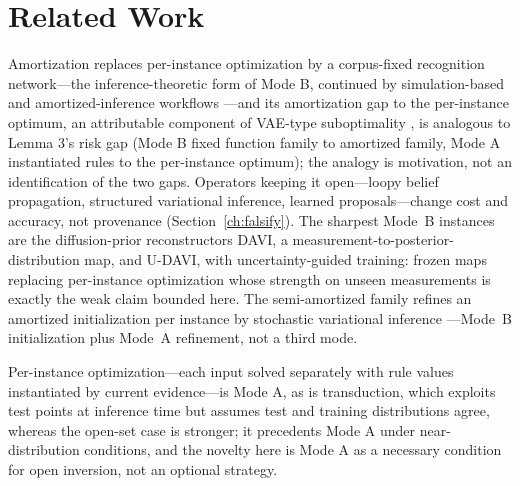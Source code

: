 \section{Related Work}
\label{ch:related}

Amortization replaces per-instance optimization by a corpus-fixed recognition network---the inference-theoretic form of Mode B, continued by simulation-based and amortized-inference workflows \citep{cranmer2020,radev2023}---and its amortization gap to the per-instance optimum, an attributable component of VAE-type suboptimality \citep{cremer2018}, is analogous to Lemma 3's risk gap (Mode B fixed function family to amortized family, Mode A instantiated rules to the per-instance optimum); the analogy is motivation, not an identification of the two gaps. Operators keeping it open---loopy belief propagation, structured variational inference, learned proposals---change cost and accuracy, not provenance (Section~\ref{ch:falsify}). The sharpest Mode~B instances are the diffusion-prior reconstructors DAVI, a measurement-to-posterior-distribution map, and U-DAVI, with uncertainty-guided training: frozen maps replacing per-instance optimization \citep{lee2024davi,varshney2026udavi} whose strength on unseen measurements is exactly the weak claim bounded here. The semi-amortized family refines an amortized initialization per instance by stochastic variational inference \citep{kim2018semi}---Mode~B initialization plus Mode~A refinement, not a third mode.

Per-instance optimization---each input solved separately with rule values instantiated by current evidence---is Mode A, as is transduction, which exploits test points at inference time \citep{vapnik1995} but assumes test and training distributions agree, whereas the open-set case is stronger; it precedents Mode A under near-distribution conditions, and the novelty here is Mode A as a necessary condition for open inversion, not an optional strategy.

